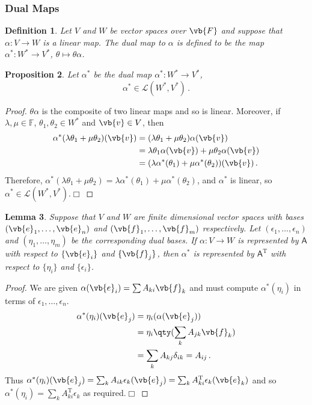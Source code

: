 \documentclass{article}
\theoremstyle{plain}\theoremheaderfont{\normalfont\itshape}\theorembodyfont{\rmfamily}\theoremseparator{.}\newtheorem*{rem}{Remark}\newtheorem*{ex}{Example}\newtheorem*{proof}{Proof}\newtheorem*{altp}{Alternative proof}
\theoremstyle{plain}\theoremheaderfont{\normalfont\bfseries}\theorembodyfont{\rmfamily}\theoremseparator{.}\newtheorem{thm}{Theorem}[section]\newtheorem{lem}[thm]{Lemma}\newtheorem{prop}[thm]{Proposition}\newtheorem*{cor}{Corollary}\newtheorem{defn}[thm]{Definition}\newtheorem{clm}[thm]{Claim}\newtheorem{clminproof}{Claim}
\theoremstyle{break}\theoremheaderfont{\normalfont\itshape}\theorembodyfont{\rmfamily}\theoremseparator{.\medskip}\newtheorem*{proofskip}{Proof}\newtheorem*{exs}{Examples}\newtheorem*{rems}{Remarks}
\theoremstyle{break}\theoremheaderfont{\normalfont\bfseries}\theorembodyfont{\rmfamily}\theoremseparator{.\medskip}\newtheorem{lemskip}[thm]{Lemma}\newtheorem{defnskip}[thm]{Definition}\newtheorem{propskip}[thm]{Proposition}\newtheorem{thmskip}[thm]{Theorem}
\numberwithin{equation}{section}
\newcommand{\qed}{\hfill\ensuremath{\Box}}
\newcommand{\tp}{^\mathrm{T}}
\begin{document}
	\subsubsection{Dual Maps}
	\begin{defn}
		Let \(V\) and \(W\) be vector spaces over \(\vb{F}\) and suppose that \(\alpha:V\to W\) is a linear map. The \textit{dual map} to \(\alpha\) is defined to be the map \(\alpha^*:W^*\to V^*\), \(\theta\mapsto\theta\alpha\).
	\end{defn}
	\begin{prop}
		Let \(\alpha^*\) be the dual map \(\alpha^*:W^*\to V^*\),
		\[\alpha^*\in\mathcal{L}(W^*,V^*)\,.\]
	\end{prop}
	\begin{proof}
		\(\theta\alpha\) is the composite of two linear maps and so is linear. Moreover, if \(\lambda,\mu\in\mathbb{F}\), \(\theta_1,\theta_2\in W^*\) and \(\vb{v}\in V\), then
	\begin{align*}
		\alpha^*(\lambda\theta_1+\mu\theta_2)(\vb{v})&=(\lambda\theta_1+\mu\theta_2)\alpha(\vb{v})\\
		&=\lambda\theta_1\alpha(\vb{v})+\mu\theta_2\alpha(\vb{v})\\
		&=(\lambda\alpha^*(\theta_1)+\mu\alpha^*(\theta_2))(\vb{v})\,.
	\end{align*}
		Therefore, \(\alpha^*(\lambda\theta_1+\mu\theta_2)=\lambda\alpha^*(\theta_1)+\mu\alpha^*(\theta_2)\), and \(\alpha^*\) is linear, so \(\alpha^*\in\mathcal{L}(W^*,V^*)\).\qed
	\end{proof}
	\begin{lem}
		Suppose that \(V\) and \(W\) are finite dimensional vector spaces with bases \((\vb{e}_1,\dots,\vb{e}_n)\) and \((\vb{f}_1,\dots,\vb{f}_m)\) respectively. Let \((\epsilon_1,\dots,\epsilon_n)\) and \((\eta_1,\dots,\eta_m)\) be the corresponding dual bases. If \(\alpha:V\to W\) is represented by \(\mathsf{A}\) with respect to \(\{\vb{e}_i\}\) and \(\{\vb{f}_j\}\), then \(\alpha^*\) is represented by \(\mathsf{A}\tp\) with respect to \(\{\eta_i\}\) and \(\{\epsilon_i\}\).
	\end{lem}
	\begin{proof}
		We are given \(\alpha(\vb{e}_i)=\sum A_{ki}\vb{f}_k\) and must compute \(\alpha^*(\eta_i)\) in terms of \(\epsilon_1,\dots,\epsilon_n\).
		\begin{align*}
			\alpha^*(\eta_i)(\vb{e}_j)&=\eta_i(\alpha(\vb{e}_j))\\
			&=\eta_i\qty(\sum_k A_{jk}\vb{f}_k)\\
			&=\sum_k A_{kj}\delta_{ik}=A_{ij}\,.
		\end{align*}
		Thus \(\alpha^*(\eta_i)(\vb{e}_j)=\sum_kA_{ik}\epsilon_k(\vb{e}_j)=\sum_kA_{ki}\tp\epsilon_k(\vb{e}_k)\) and so \(\alpha^*(\eta_i)=\sum_k A_{ki}\tp\epsilon_k\) as required.\qed
	\end{proof}
\end{document}

